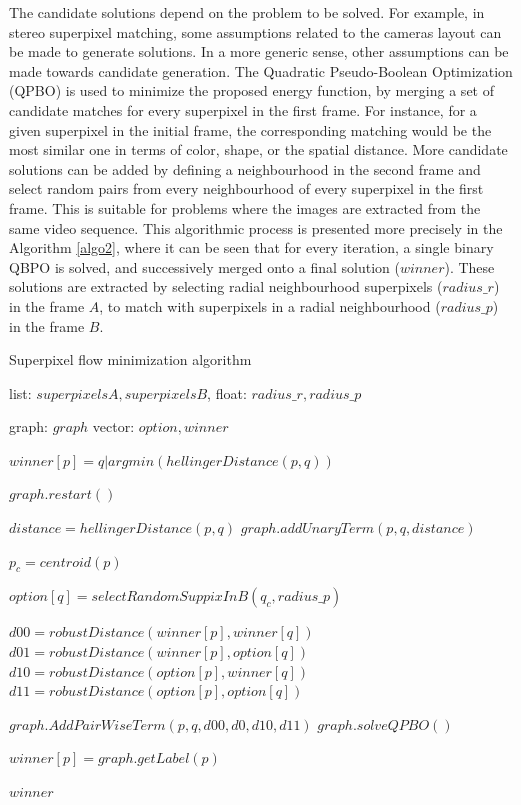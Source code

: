 The candidate solutions depend on the problem to be solved. 
For example, in stereo superpixel matching, some assumptions related to the cameras 
layout can be made to generate solutions. In a more generic sense, other assumptions can be made towards 
candidate generation. 
The Quadratic Pseudo-Boolean Optimization (QPBO) \cite{c3}\cite{c4} is used to minimize the proposed energy function, 
by merging a set of candidate matches for every superpixel in the first frame.
For instance, for a given superpixel in the initial frame, the corresponding 
matching would be the most similar one in terms of color, shape, or the spatial distance. More candidate solutions can be added by defining a
neighbourhood in the second frame and select random pairs from every neighbourhood of every superpixel
in the first frame. This is suitable for problems where the images are extracted from the same video
sequence. This algorithmic process is presented more precisely in the Algorithm \ref{algo2}, where it 
can be seen that for every iteration, a single binary QBPO is solved, and successively 
merged onto a final solution ($winner$). These solutions are extracted by selecting 
radial neighbourhood superpixels ($radius\_r$) in the frame $A$, to match with 
superpixels in a radial neighbourhood ($radius\_p$) in the frame $B$.

\begin{algorithm}[thpb]
\caption{Superpixel flow minimization algorithm}
\label{algo2}
\begin{algorithmic}
\REQUIRE list: $superpixelsA, superpixelsB$, float: $radius\_r, radius\_p$

graph: $graph$
vector: $option, winner$

\STATE $winner[p] = q | argmin( hellingerDistance(p, q) )$
	
	\STATE $graph.restart()$
	
	
    		\STATE $distance = hellingerDistance(p, q)$
    		\STATE $graph.addUnaryTerm(p, q, distance)$

		\ENDFOR
	\ENDFOR

		\STATE $p_c = centroid(p)$

		\STATE $option[q] = selectRandomSuppixInB( q_c, radius\_p )$
		
		\STATE $d00 = robustDistance(winner[p], winner[q])$
		\STATE $d01 = robustDistance(winner[p], option[q])$
		\STATE $d10 = robustDistance(option[p], winner[q])$
		\STATE $d11 = robustDistance(option[p], option[q])$
								
		\STATE $graph.AddPairWiseTerm(p,q,d00,d0,d10,d11)$
		\STATE $graph.solveQPBO()$
		\ENDFOR
	\ENDFOR
	
		\STATE $winner[p] = graph.getLabel(p)$
	\ENDFOR
\ENDFOR

\RETURN $winner$
\end{algorithmic}
\end{algorithm}

